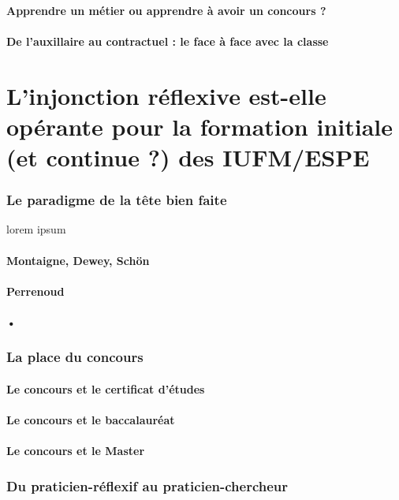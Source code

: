 \documentclass[a4paper,11pt]{article}
\begin{document}
			\subsection{Apprendre un métier ou apprendre à avoir un concours ?}
			\subsection{De l'auxillaire au contractuel : le face à face avec la classe}


\part{L'injonction réflexive est-elle opérante pour la formation initiale (et continue ?) des IUFM/ESPE}

\section{Le paradigme de la tête bien faite}
lorem ipsum
			\subsection{Montaigne, Dewey, Schön}
			\subsection{Perrenoud}
			\subsection{•}


\section{La place du concours}

			\subsection{Le concours et le certificat d'études}
			\subsection{Le concours et le baccalauréat}
			\subsection{Le concours et le Master}
			
\section{Du praticien-réflexif au praticien-chercheur}
\end{document}
